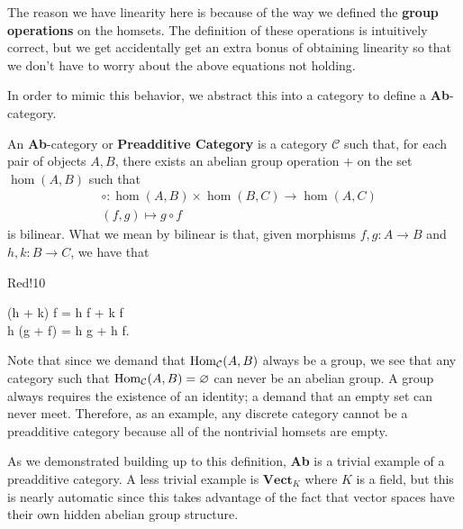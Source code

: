 \textcolor{NavyBlue}{The reason we have linearity here is because of the way we defined 
the \textbf{group operations} on the homsets. The definition of these operations 
is intuitively correct, but we get accidentally get an extra bonus of obtaining linearity 
so that we don't have to worry about the above equations not holding.}

In order to mimic this behavior, we abstract this into a category to define 
a \textbf{Ab}-category. 

\begin{definition}
    An \textbf{Ab}-category or \textbf{Preadditive Category} is a 
    category $\mathcal{C}$ such that, for each pair of objects $A, B$, 
    there exists an abelian group operation $+$ on the set $\hom(A, B)$ such 
    that 
    \begin{align*}
        &\circ: \hom(A, B)\times \hom(B, C) \to \hom(A, C)\\
        &(f, g) \mapsto g \circ f
    \end{align*}
    is bilinear. What we mean by bilinear is that, given morphisms $f, g: A \to B$ and $h, k: B \to C$, 
    we have that 
    \begin{statement}{Red!10}
        \begin{align_topbot}
            (h + k) \circ f = h \circ f + k \circ f\\
            h \circ (g + f) = h \circ g + h \circ f.
        \end{align_topbot}
    \end{statement}
\end{definition}

\textcolor{NavyBlue}{Note that since we demand that $\operatorname{\mathrm{Hom}}_{\mathcal{C}}(A, B)$ always 
be a group, we see that any category such that $\operatorname{\mathrm{Hom}}_{\mathcal{C}}(A, B) = \varnothing$ 
can never be an abelian group. A group always requires the existence of an identity; 
a demand that an empty set can never meet}. Therefore, as an example, any discrete 
category cannot be a preadditive category because all of the nontrivial homsets 
are empty. 

As we demonstrated building up to this definition, \textbf{Ab} is a trivial example 
of a preadditive category. A less trivial example is $\textbf{Vect}_K$
where $K$ is a field, but this is nearly automatic since this takes advantage 
of the fact that vector spaces have their own hidden abelian group structure. 

